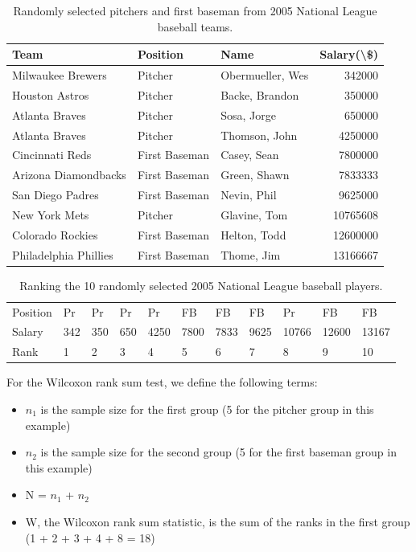 \documentclass[
]{report}
\providecommand{\tightlist}{%
  \setlength{\itemsep}{0pt}\setlength{\parskip}{0pt}}
\begin{document}
\begin{table}

\caption{\label{tab:table2}Randomly selected pitchers and first baseman from 2005 National League baseball teams.}
\centering
\begin{tabular}[t]{lllr}
\toprule
Team & Position & Name & Salary(\textbackslash{}\$)\\
\midrule
Milwaukee Brewers & Pitcher & Obermueller, Wes & 342000\\
Houston Astros & Pitcher & Backe, Brandon & 350000\\
Atlanta Braves & Pitcher & Sosa, Jorge & 650000\\
Atlanta Braves & Pitcher & Thomson, John & 4250000\\
Cincinnati Reds & First Baseman & Casey, Sean & 7800000\\
\addlinespace
Arizona Diamondbacks & First Baseman & Green, Shawn & 7833333\\
San Diego Padres & First Baseman & Nevin, Phil & 9625000\\
New York Mets & Pitcher & Glavine, Tom & 10765608\\
Colorado Rockies & First Baseman & Helton, Todd & 12600000\\
Philadelphia Phillies & First Baseman & Thome, Jim & 13166667\\
\bottomrule
\end{tabular}
\end{table}

\begin{table}

\caption{\label{tab:table3}Ranking the 10 randomly selected 2005 National League baseball players.}
\centering
\begin{tabular}[t]{lllllllllll}
\toprule
Position & Pr & Pr & Pr & Pr & FB & FB & FB & Pr & FB & FB\\
Salary & 342 & 350 & 650 & 4250 & 7800 & 7833 & 9625 & 10766 & 12600 & 13167\\
Rank & 1 & 2 & 3 & 4 & 5 & 6 & 7 & 8 & 9 & 10\\
\bottomrule
\end{tabular}
\end{table}

For the Wilcoxon rank sum test, we define the following terms:

\begin{itemize}
\tightlist
\item
  \(\scriptstyle n_1\) is the sample size for the first group (5 for the pitcher group in this example)
\item
  \(\scriptstyle n_2\) is the sample size for the second group (5 for the first baseman group in this example)
\item
  N = \(\scriptstyle n_1\) + \(\scriptstyle n_2\)
\item
  W, the Wilcoxon rank sum statistic, is the sum of the ranks in the first group
  (1 + 2 + 3 + 4 + 8 = 18)
\end{itemize}
\end{document}
